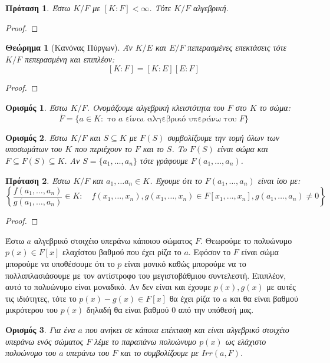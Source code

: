 \documentclass[oneside,a4paper]{article}
\newtheorem{theorem}{Θεώρημα}
\newtheorem*{defn}{Ορισμός}
\newtheorem{prop}{Πρόταση}
\begin{document}
\begin{prop}
	Έστω $K/F$ με $[K:F]<\infty$. Τότε $K/F$ αλγεβρική.
\end{prop}

\begin{proof}
\end{proof}

\begin{theorem}[Κανόνας Πύργων]
	Άν $K/E$ και $E/F$ πεπερασμένες επεκτάσεις τότε $K/F$ πεπερασμένη και επιπλέον:
	$$[K:F]=[K:E][E:F]$$
\end{theorem}
\begin{proof}
\end{proof}

\begin{defn} Έστω $K/F$. Ονομάζουμε αλγεβρική κλειστότητα του $F$ στο $K$ το σώμα:
	$$\overline F = \{a \in K: \text{ το } a \text{ είναι αλγεβρικό υπεράνω του } F\}$$ 
\end{defn} %

\begin{defn} Έστω $K/F$ και $S\subseteq K$ με $F(S)$ συμβολίζουμε την τομή όλων των υποσωμάτων του $K$ που περιέχουν το $F$ και το $S$. To $F(S)$ είναι σώμα και $F\subseteq F(S) \subseteq K$. Αν $S=\{a_1, \ldots, a_n\}$ τότε γράφουμε $F(a_1, \ldots, a_n)$.

\end{defn}

\begin{prop} Έστω $K/F$ και $a_1,\ldots a_n \in K$. Έχουμε ότι το $F(a_1, \ldots , a_n)$  είναι ίσο με:
	$$ \left\{\frac{f(a_1,\ldots,a_n)}{g(a_1,\ldots, a_n)} \in K: \quad f(x_1,\ldots,x_n), g(x_1,\ldots,x_n) \in F[x_1,\ldots,x_n] , g(a_1,\ldots,a_n)\neq 0\right\}$$
\end{prop}

\begin{proof}
\end{proof}

Έστω $a$ αλγεβρικό στοιχέιο υπεράνω κάποιου σώματος $F$. Θεωρούμε το πολυώνυμο $p(x) \in F[x]$ ελαχίστου βαθμού που έχει ρίζα το $a$. Εφόσον το $F$ είναι σώμα μπορούμε να υποθέσουμε ότι το $p$ είναι μονικό καθώς μπορούμε να το πολλαπλασιάσουμε με τον αντίστροφο του μεγιστοβάθμιου συντελεστή. Επιπλέον, αυτό το πολυώνυμο είναι μοναδικό. Αν δεν είναι και έχουμε $p(x), g(x)$ με αυτές τις ιδιότητες, τότε το $p(x)-g(x) \in F[x]$ θα έχει ρίζα το $a$ και θα είναι βαθμού μικρότερου του $p(x)$ δηλαδή θα είναι βαθμού 0 από την υπόθεσή μας.
\begin{defn} Για ένα $a$ που ανήκει σε κάποια επέκταση και είναι αλγεβρικό στοιχέιο υπεράνω ενός σώματος $F$ λέμε το παραπάνω πολυώνυμο $p(x)$ ως ελάχιστο πολυώνυμο του $a$ υπεράνω του $F$ και το συμβολίζουμε με $Irr(a,F)$. 
\end{defn}
\end{document}
